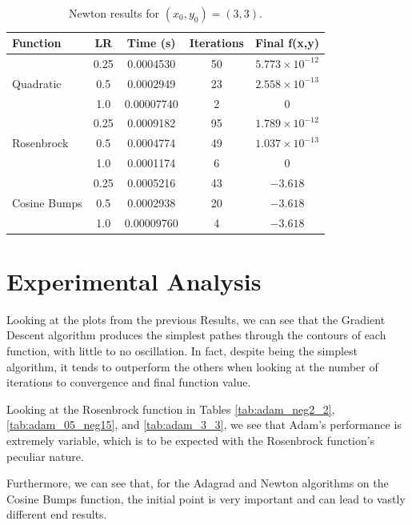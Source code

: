 \documentclass[conference]{IEEEtran}
\begin{document}
\begin{table}[H]
    \centering
    \caption{Newton results for $(x_0,y_0) = (3,3)$.}
    \label{tab:newton_3_3}
    \begin{tabular}{lcccc}
        \hline
        \textbf{Function} & \textbf{LR} & \textbf{Time (s)} &
        \textbf{Iterations} & \textbf{Final f(x,y)} \\
        \hline

        \multirow{3}{*}{Quadratic}
        & 0.25 & 0.0004530 & 50 & $5.773\times10^{-12}$ \\
        & 0.5  & 0.0002949 & 23 & $2.558\times10^{-13}$ \\
        & 1.0  & 0.00007740 & 2 & 0 \\
        \hline

        \multirow{3}{*}{Rosenbrock}
        & 0.25 & 0.0009182 & 95 & $1.789\times10^{-12}$ \\
        & 0.5  & 0.0004774 & 49 & $1.037\times10^{-13}$ \\
        & 1.0  & 0.0001174 & 6 & 0 \\
        \hline

        \multirow{3}{*}{Cosine Bumps}
        & 0.25 & 0.0005216 & 43 & $-3.618$ \\
        & 0.5  & 0.0002938 & 20 & $-3.618$ \\
        & 1.0  & 0.00009760 & 4 & $-3.618$ \\
        \hline

    \end{tabular}
\end{table}

\section{Experimental Analysis}
Looking at the plots from the previous Results, we can see that the Gradient Descent algorithm
produces the simplest pathes through the contours of each function, with little to no oscillation.
In fact, despite being the simplest algorithm, it tends to outperform the others when looking at
the number of iterations to convergence and final function value.

Looking at the Rosenbrock function in Tables \ref{tab:adam_neg2_2}, \ref{tab:adam_05_neg15}, and \ref{tab:adam_3_3},
we see that Adam's performance is extremely variable, which is to be expected with the Rosenbrock function's
peculiar nature.

Furthermore, we can see that, for the Adagrad and Newton algorithms on the Cosine Bumps function,
the initial point is very important and can lead to vastly different end results.
\end{document}
